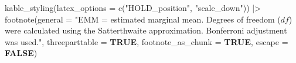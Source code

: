 \documentclass[
  bookmarksnumbered]{article}
\newenvironment{Shaded}{\begin{snugshade}}{\end{snugshade}}
\newcommand{\AttributeTok}[1]{\textcolor[rgb]{0.80,0.80,0.80}{#1}}
\newcommand{\ConstantTok}[1]{\textcolor[rgb]{0.86,0.64,0.64}{\textbf{#1}}}
\newcommand{\FunctionTok}[1]{\textcolor[rgb]{0.94,0.94,0.56}{#1}}
\newcommand{\NormalTok}[1]{\textcolor[rgb]{0.80,0.80,0.80}{#1}}
\newcommand{\SpecialCharTok}[1]{\textcolor[rgb]{0.86,0.64,0.64}{#1}}
\newcommand{\StringTok}[1]{\textcolor[rgb]{0.80,0.58,0.58}{#1}}
\begin{document}
\begin{Shaded}
\begin{Highlighting}[]
  \FunctionTok{kable\_styling}\NormalTok{(}\AttributeTok{latex\_options =} \FunctionTok{c}\NormalTok{(}\StringTok{"HOLD\_position"}\NormalTok{, }\StringTok{"scale\_down"}\NormalTok{)) }\SpecialCharTok{|\textgreater{}}
  \FunctionTok{footnote}\NormalTok{(}\AttributeTok{general =} \StringTok{"EMM = estimated marginal mean.}
\StringTok{           Degrees of freedom ($df$) were calculated }
\StringTok{           using the Satterthwaite approximation.}
\StringTok{           Bonferroni adjustment was used."}\NormalTok{,}
           \AttributeTok{threeparttable =} \ConstantTok{TRUE}\NormalTok{,}
           \AttributeTok{footnote\_as\_chunk =} \ConstantTok{TRUE}\NormalTok{,}
           \AttributeTok{escape =} \ConstantTok{FALSE}\NormalTok{)}
\end{Highlighting}
\end{Shaded}
\end{document}
